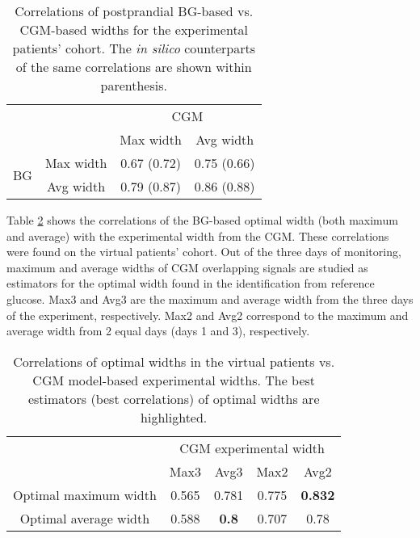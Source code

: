 \begin{table}[hbtp]
	\centering
	\begin{tabular}{ c  c | c  c }
	\hline 
	 & & \multicolumn{2}{c}{CGM} \\
   & & Max width & Avg width  \\
	\hline 
  \multirow{2}{*}{BG} & Max width & 0.67 (0.72) & 0.75 (0.66) \\
	& Avg width & 0.79 (0.87) & 0.86 (0.88) \\
	\hline 
	\end{tabular}
\caption{Correlations of postprandial BG-based vs. CGM-based widths for the experimental patients' cohort. The \textit{in silico} counterparts of the same correlations are shown within parenthesis.}
\label{tab:widthscorre}
\end{table}

Table \ref{tab:optwidthestimators} shows the correlations of the BG-based optimal width (both maximum and average) with the experimental width from the CGM. These correlations were found on the virtual patients' cohort. Out of the three days of monitoring, maximum and average widths of CGM overlapping signals are studied as estimators for the optimal width found in the identification from reference glucose. Max3 and Avg3 are the maximum and average width from the three days of the experiment, respectively. Max2 and Avg2 correspond to the maximum and average width from 2 equal days (days 1 and 3), respectively.

\begin{table}[hbtp]
	\centering
	\begin{tabular}{ c  c  c  c  c }
	\hline 
	 & \multicolumn{4}{c}{CGM experimental width} \\
   & Max3 & Avg3 & Max2 & Avg2 \\
	\hline 
  Optimal maximum width & 0.565 & 0.781 & 0.775 & \textbf{0.832} \\
	Optimal average width & 0.588 & \textbf{0.8} & 0.707 & 0.78 \\
	\hline 
	\end{tabular}
\caption{Correlations of optimal widths in the virtual patients vs. CGM model-based experimental widths. The best estimators (best correlations) of optimal widths are highlighted.}
\label{tab:optwidthestimators}
\end{table}

